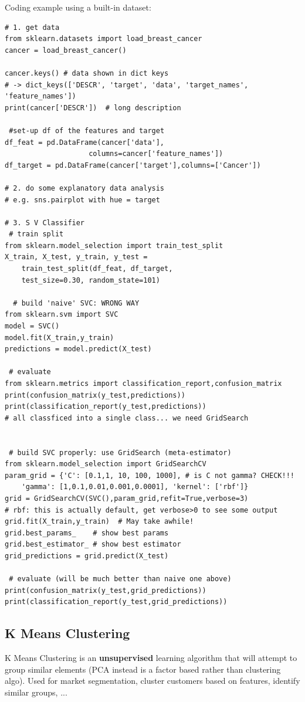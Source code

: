 \documentclass[12pt]{article}
\begin{document}
Coding example using a built-in dataset:
\begin{lstlisting}
# 1. get data
from sklearn.datasets import load_breast_cancer
cancer = load_breast_cancer()

cancer.keys() # data shown in dict keys
# -> dict_keys(['DESCR', 'target', 'data', 'target_names', 'feature_names'])
print(cancer['DESCR'])  # long description
 
 #set-up df of the features and target
df_feat = pd.DataFrame(cancer['data'], 
					columns=cancer['feature_names'])
df_target = pd.DataFrame(cancer['target'],columns=['Cancer'])

# 2. do some explanatory data analysis
# e.g. sns.pairplot with hue = target

# 3. S V Classifier
 # train split
from sklearn.model_selection import train_test_split
X_train, X_test, y_train, y_test = 
	train_test_split(df_feat, df_target, 
	test_size=0.30, random_state=101)
	
  # build 'naive' SVC: WRONG WAY
from sklearn.svm import SVC
model = SVC()
model.fit(X_train,y_train)
predictions = model.predict(X_test)

 # evaluate
from sklearn.metrics import classification_report,confusion_matrix
print(confusion_matrix(y_test,predictions))
print(classification_report(y_test,predictions))
# all classficed into a single class... we need GridSearch

 
 # build SVC properly: use GridSearch (meta-estimator)
from sklearn.model_selection import GridSearchCV
param_grid = {'C': [0.1,1, 10, 100, 1000], # is C not gamma? CHECK!!!
	'gamma': [1,0.1,0.01,0.001,0.0001], 'kernel': ['rbf']}  
grid = GridSearchCV(SVC(),param_grid,refit=True,verbose=3)	
# rbf: this is actually default, get verbose>0 to see some output
grid.fit(X_train,y_train)  # May take awhile!
grid.best_params_    # show best params
grid.best_estimator_ # show best estimator
grid_predictions = grid.predict(X_test)

 # evaluate (will be much better than naive one above)
print(confusion_matrix(y_test,grid_predictions))
print(classification_report(y_test,grid_predictions))
\end{lstlisting}

\subsection{K Means Clustering}
K Means Clustering is an \textbf{unsupervised} learning algorithm that will attempt to group similar elements (PCA instead is a factor based rather than clustering algo). Used for market segmentation, cluster customers based on features, identify similar groups, ...
\end{document}
